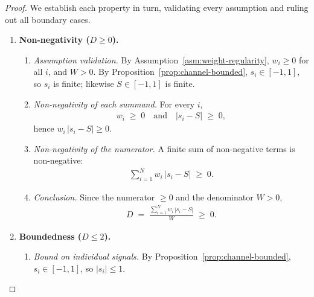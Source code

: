 \documentclass[12pt,openany]{book}
\numberwithin{equation}{chapter}
\theoremstyle{plain}
\theoremstyle{definition}
\theoremstyle{remark}
\numberwithin{equation}{chapter}
\theoremstyle{plain}
\begin{document}
\begin{proof}
We establish each property in turn, validating every assumption and
ruling out all boundary cases.

\begin{enumerate}

  \item \textbf{Non-negativity ($D \geq 0$).}

  \begin{enumerate}
    \item \emph{Assumption validation.}
          By Assumption~\ref{asm:weight-regularity}, $w_i \geq 0$
          for all $i$, and $W > 0$.
          By Proposition~\ref{prop:channel-bounded},
          $s_i \in [-1,1]$, so $s_i$ is finite; likewise
          $S \in [-1,1]$ is finite.

    \item \emph{Non-negativity of each summand.}
          For every $i$,
          \begin{align}
            w_i \;\geq\; 0
            \quad\text{and}\quad
            \bigl|s_i - S\bigr| \;\geq\; 0,
          \end{align}
          hence $w_i \,|s_i - S| \geq 0$.

    \item \emph{Non-negativity of the numerator.}
          A finite sum of non-negative terms is non-negative:
          \begin{align}
            \sum_{i=1}^{N} w_i\,\bigl|s_i - S\bigr| \;\geq\; 0.
          \end{align}

    \item \emph{Conclusion.}
          Since the numerator $\geq 0$ and the denominator
          $W > 0$,
          \begin{align}
            D \;=\;
            \frac{\displaystyle\sum_{i=1}^{N}
                  w_i\,|s_i - S|}{W}
            \;\geq\; 0.
          \end{align}
  \end{enumerate}

  \item \textbf{Boundedness ($D \leq 2$).}

  \begin{enumerate}
    \item \emph{Bound on individual signals.}
          By Proposition~\ref{prop:channel-bounded},
          $s_i \in [-1,1]$, so $|s_i| \leq 1$.


\end{enumerate}
\end{enumerate}
\end{proof}
\end{document}

